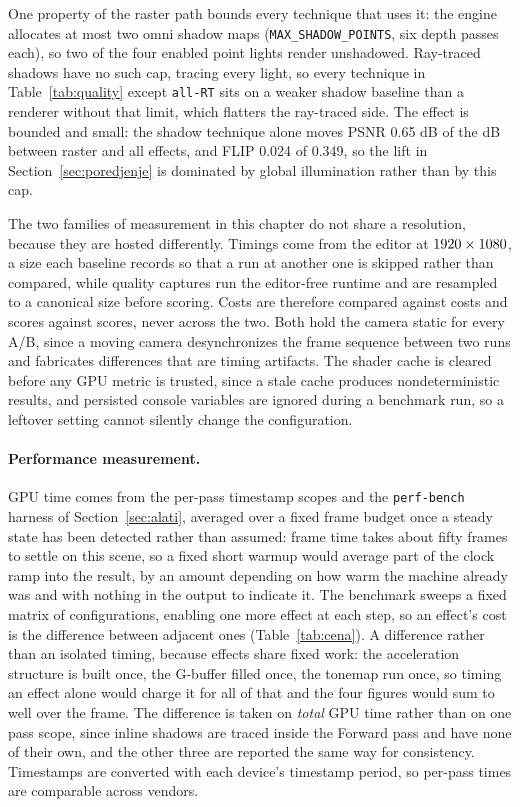 One property of the raster path bounds every technique that uses it: the engine allocates at most two
omni shadow maps (\texttt{MAX\_SHADOW\_POINTS}, six depth passes each), so two of the four enabled
point lights render unshadowed. Ray-traced shadows have no such cap, tracing every light, so
every technique in Table~\ref{tab:quality} except \texttt{all-RT} sits on a weaker shadow baseline
than a renderer without that limit, which flatters the ray-traced side. The effect is bounded and
small: the shadow technique alone moves PSNR 0.65 dB of the \qRtLiftPsnr{} dB between raster and all effects,
and FLIP 0.024 of 0.349, so the lift in Section~\ref{sec:poredjenje} is dominated by global
illumination rather than by this cap.

The two families of measurement in this chapter do not share a resolution, because they are hosted
differently. Timings come from the editor at $1920{} \times 1080{}$, a size each baseline records so that
a run at another one is skipped rather than compared, while quality captures run the editor-free
runtime and are resampled to a canonical size before scoring. Costs are therefore compared against
costs and scores against scores, never across the two. Both hold the camera static for every A/B,
since a moving camera desynchronizes the frame sequence between two runs and fabricates differences
that are timing artifacts. The shader cache is cleared before any GPU metric is trusted, since a
stale cache produces nondeterministic results, and persisted console variables are ignored during a
benchmark run, so a leftover setting cannot silently change the configuration.

\paragraph{Performance measurement.} GPU time comes from the per-pass timestamp scopes and the
\texttt{perf-bench} harness of Section~\ref{sec:alati}, averaged over a fixed frame budget once a
steady state has been detected rather than assumed: frame time takes about fifty frames to settle on
this scene, so a fixed short warmup would average part of the clock ramp into the result, by an
amount depending on how warm the machine already was and with nothing in the output to indicate it.
The benchmark sweeps a fixed matrix of configurations, enabling one more effect at each step, so an
effect's cost is the difference between adjacent ones (Table~\ref{tab:cena}). A difference rather
than an isolated timing, because effects share fixed work: the acceleration structure is built once,
the G-buffer filled once, the tonemap run once, so timing an effect alone would charge it for all of
that and the four figures would sum to well over the frame. The difference is taken on \emph{total}
GPU time rather than on one pass scope, since inline shadows are traced inside the Forward pass and
have none of their own, and the other three are reported the same way for consistency. Timestamps are
converted with each device's timestamp period, so per-pass times are comparable across vendors.

